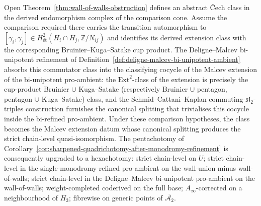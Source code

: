 \begin{remark}
\label{rem:wall-of-walls-obstruction-as-extension-class}
%
Open Theorem~\textup{\ref{thm:wall-of-walls-obstruction}} defines an
abstract \v Cech class in the derived endomorphism complex of the
comparison cone.  Assume the comparison required there carries the
transition automorphism to
$[\gamma_i,\gamma_j]\in
H^2_{\text{\'et}}(H_i\cap H_j,\mathbb{Z}/N_{ij})$
and identifies its derived extension class with the corresponding
Bruinier--Kuga--Satake cup product.  The Deligne--Malcev bi-unipotent
refinement of
Definition~\textup{\ref{def:deligne-malcev-bi-unipotent-ambient}}
absorbs this commutator class into the classifying cocycle of the
Malcev extension of the bi-unipotent pro-ambient: the
$\mathrm{Ext}^2$-class of the extension is precisely the cup-product
Bruinier $\cup$ Kuga--Satake (respectively Bruinier $\cup$ pentagon,
pentagon $\cup$ Kuga--Satake) class, and the
Schmid--Cattani--Kaplan commuting-$\mathfrak{sl}_2$-triples
construction furnishes the canonical splitting that trivialises this
cocycle inside the bi-refined pro-ambient.  Under these comparison
hypotheses, the class becomes the Malcev extension datum whose canonical
splitting produces the strict chain-level quasi-isomorphism. The
pentachotomy of
Corollary~\textup{\ref{cor:sharpened-quadrichotomy-after-monodromy-refinement}}
is consequently upgraded to a hexachotomy: strict chain-level on $U$;
strict chain-level in the single-monodromy-refined pro-ambient on the
wall-union minus wall-of-walls; strict chain-level in the
Deligne--Malcev bi-unipotent pro-ambient on the wall-of-walls;
weight-completed coderived on the full base;
$A_\infty$-corrected on a neighbourhood of $H_3$; fibrewise on generic
points of $\overline{\mathcal{A}_2}$.
\end{remark}

